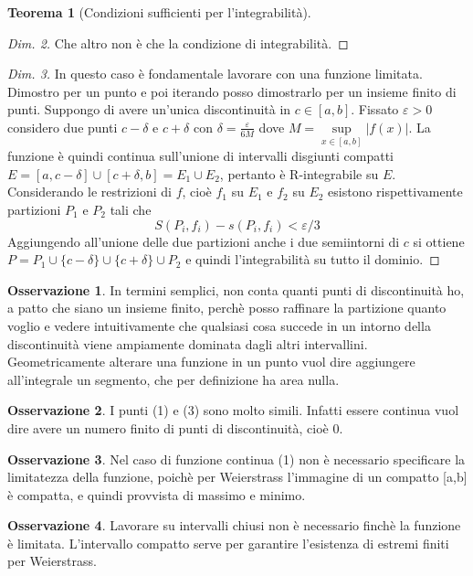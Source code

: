 \documentclass{article}
\theoremstyle{definition}
\newtheorem{theorem}{Teorema}[section]
\theoremstyle{definition}
\theoremstyle{definition}
\theoremstyle{definition}
\newtheorem{remark}{Osservazione}[section]
\theoremstyle{definition}
\theoremstyle{definition}
\begin{document}
\begin{theorem}[Condizioni sufficienti per l'integrabilità]
\begin{proof}[Dim. 2]
        Che altro non è che la condizione di integrabilità.
    \end{proof}
    \begin{proof}[Dim. 3]
        In questo caso è fondamentale lavorare con una funzione limitata. Dimostro per un punto e poi iterando posso dimostrarlo per un insieme finito di punti. Suppongo di avere un'unica discontinuità in $c \in [a,b]$. Fissato $\varepsilon>0$ considero due punti $c-\delta$ e $c+\delta$ con $\delta = \frac{\varepsilon}{6M}$ dove $M=\underset{x\in[a,b]}\sup |f(x)|$. La funzione è quindi continua sull'unione di intervalli disgiunti compatti $E=[a,c-\delta]\cup [c+\delta,b] = E_1 \cup E_2$, pertanto è R-integrabile su $E$. Considerando le restrizioni di $f$, cioè $f_1$ su $E_1$ e $f_2$ su $E_2$ esistono rispettivamente partizioni $P_1$ e $P_2$ tali che 
        \[
            S(P_i,f_i) - s(P_i,f_i) < \varepsilon/3        
        \]
        Aggiungendo all'unione delle due partizioni anche i due semiintorni di $c$ si ottiene $P=P_1 \cup \lbrace c-\delta \rbrace \cup \lbrace c+\delta \rbrace \cup P_2$ e quindi l'integrabilità su tutto il dominio.
        \end{proof}
\end{theorem}

\begin{remark}
    In termini semplici, non conta quanti punti di discontinuità ho, a patto che siano un insieme finito, perchè posso raffinare la partizione quanto voglio e vedere intuitivamente che qualsiasi cosa succede in un intorno della discontinuità viene ampiamente dominata dagli altri intervallini. Geometricamente alterare una funzione in un punto vuol dire aggiungere all'integrale un segmento, che per definizione ha area nulla.
\end{remark}
\begin{remark}
    I punti (1) e (3) sono molto simili. Infatti essere continua vuol dire avere un numero finito di punti di discontinuità, cioè 0.
\end{remark}

\begin{remark}
    Nel caso di funzione continua (1) non è necessario specificare la limitatezza della funzione, poichè per Weierstrass l'immagine di un compatto [a,b] è compatta, e quindi provvista di massimo e minimo.
\end{remark}

\begin{remark}
    Lavorare su intervalli chiusi non è necessario finchè la funzione è limitata. L'intervallo compatto serve per garantire l'esistenza di estremi finiti per Weierstrass.
\end{remark}
\end{document}
